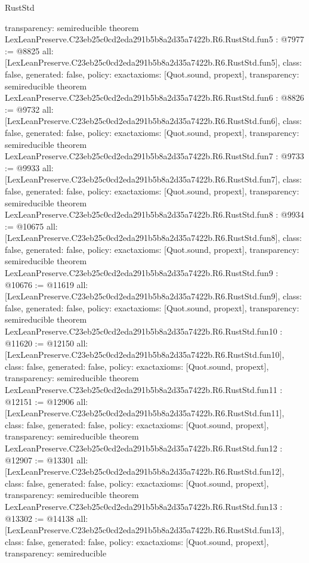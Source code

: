 \begin{lexlean}{RustStd}
\begin{coremodule}
{  transparency: semireducible
}
theorem LexLeanPreserve.C23eb25c0cd2eda291b5b8a2d35a7422b.R6.RustStd.fun5 : @7977 := @8825 {
  all: [LexLeanPreserve.C23eb25c0cd2eda291b5b8a2d35a7422b.R6.RustStd.fun5],
  class: false,
  generated: false,
  policy: exact{axioms: [Quot.sound, propext]},
  transparency: semireducible
}
theorem LexLeanPreserve.C23eb25c0cd2eda291b5b8a2d35a7422b.R6.RustStd.fun6 : @8826 := @9732 {
  all: [LexLeanPreserve.C23eb25c0cd2eda291b5b8a2d35a7422b.R6.RustStd.fun6],
  class: false,
  generated: false,
  policy: exact{axioms: [Quot.sound, propext]},
  transparency: semireducible
}
theorem LexLeanPreserve.C23eb25c0cd2eda291b5b8a2d35a7422b.R6.RustStd.fun7 : @9733 := @9933 {
  all: [LexLeanPreserve.C23eb25c0cd2eda291b5b8a2d35a7422b.R6.RustStd.fun7],
  class: false,
  generated: false,
  policy: exact{axioms: [Quot.sound, propext]},
  transparency: semireducible
}
theorem LexLeanPreserve.C23eb25c0cd2eda291b5b8a2d35a7422b.R6.RustStd.fun8 : @9934 := @10675 {
  all: [LexLeanPreserve.C23eb25c0cd2eda291b5b8a2d35a7422b.R6.RustStd.fun8],
  class: false,
  generated: false,
  policy: exact{axioms: [Quot.sound, propext]},
  transparency: semireducible
}
theorem LexLeanPreserve.C23eb25c0cd2eda291b5b8a2d35a7422b.R6.RustStd.fun9 : @10676 := @11619 {
  all: [LexLeanPreserve.C23eb25c0cd2eda291b5b8a2d35a7422b.R6.RustStd.fun9],
  class: false,
  generated: false,
  policy: exact{axioms: [Quot.sound, propext]},
  transparency: semireducible
}
theorem LexLeanPreserve.C23eb25c0cd2eda291b5b8a2d35a7422b.R6.RustStd.fun10 : @11620 := @12150 {
  all: [LexLeanPreserve.C23eb25c0cd2eda291b5b8a2d35a7422b.R6.RustStd.fun10],
  class: false,
  generated: false,
  policy: exact{axioms: [Quot.sound, propext]},
  transparency: semireducible
}
theorem LexLeanPreserve.C23eb25c0cd2eda291b5b8a2d35a7422b.R6.RustStd.fun11 : @12151 := @12906 {
  all: [LexLeanPreserve.C23eb25c0cd2eda291b5b8a2d35a7422b.R6.RustStd.fun11],
  class: false,
  generated: false,
  policy: exact{axioms: [Quot.sound, propext]},
  transparency: semireducible
}
theorem LexLeanPreserve.C23eb25c0cd2eda291b5b8a2d35a7422b.R6.RustStd.fun12 : @12907 := @13301 {
  all: [LexLeanPreserve.C23eb25c0cd2eda291b5b8a2d35a7422b.R6.RustStd.fun12],
  class: false,
  generated: false,
  policy: exact{axioms: [Quot.sound, propext]},
  transparency: semireducible
}
theorem LexLeanPreserve.C23eb25c0cd2eda291b5b8a2d35a7422b.R6.RustStd.fun13 : @13302 := @14138 {
  all: [LexLeanPreserve.C23eb25c0cd2eda291b5b8a2d35a7422b.R6.RustStd.fun13],
  class: false,
  generated: false,
  policy: exact{axioms: [Quot.sound, propext]},
  transparency: semireducible
}
\end{coremodule}
\end{lexlean}

